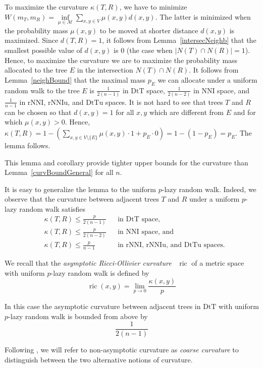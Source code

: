 \documentclass{amsart}
\theoremstyle{definition}
\newcommand{\nni}{\mathrm{NNI}}
\newcommand{\rnni}{\mathrm{rNNI}}
\newcommand{\rnniu}{\mathrm{rNNIu}}
\newcommand{\dtt}{\mathrm{DtT}}
\newcommand{\dttu}{\mathrm{DtTu}}
\newcommand{\ric}{\operatorname{ric}}
\newcommand{\M}{\mathcal{M}}
\begin{document}
\proof
To maximize the curvature $\kappa(T,R)$, we have to minimize $W(m_T,m_R) = \inf\limits_{\mu\in\M} \sum\limits_{x,y\in V}\mu(x,y) d(x,y)$.
The latter is minimized when the probability mass $\mu(x,y)$ to be moved at shorter distance $d(x,y)$ is maximized.
Since $d(T,R) = 1$, it follows from Lemma~\ref{intersecNeighb} that the smallest possible value of $d(x,y)$ is $0$ (the case when $|N(T) \cap N(R)| = 1$).
Hence, to maximize the curvature we are to maximize the probability mass allocated to the tree $E$ in the intersection $N(T) \cap N(R)$.
It follows from Lemma~\ref{neighBound} that the maximal mass $p_E$ we can allocate under a uniform random walk to the tree $E$ is $\frac{1}{2(n-1)}$ in $\dtt$ space, $\frac{1}{2(n-2)}$ in $\nni$ space, and $\frac{1}{n-1}$ in $\rnni$, $\rnniu$, and $\dttu$ spaces.
It is not hard to see that trees $T$ and $R$ can be chosen so that $d(x,y) = 1$ for all $x,y$ which are different from $E$ and for which $\mu(x,y) > 0$.
Hence, $\kappa(T, R) = 1 - \left(\sum\limits_{x,y\in V\setminus\{E\}}\mu(x,y)\cdot 1 + p_E \cdot 0\right) = 1 - (1-p_E) = p_E$.
The lemma follows.
\endproof

This lemma and corollary provide tighter upper bounds for the curvature than Lemma~\ref{curvBoundGeneral} for all $n$.

It is easy to generalize the lemma to the uniform $p$-lazy random walk.
Indeed, we observe that the curvature between adjacent trees $T$ and $R$ under a uniform $p$-lazy random walk satisfies
\begin{align*}
& \kappa(T,R) \leq \frac{p}{2(n-1)}	&& \mbox{in $\dtt$ space,}\\
& \kappa(T,R) \leq \frac{p}{2(n-2)}	&& \mbox{in $\nni$ space, and}\\
& \kappa(T,R) \leq \frac{p}{n-1}		&& \mbox{in $\rnni$, $\rnniu$, and $\dttu$ spaces.}
\end{align*}

We recall that the {\em asymptotic Ricci-Ollivier curvature}~\autocite{Loisel2014-gu} $\ric$ of a metric space with uniform $p$-lazy random walk is defined by
\[
\ric(x,y) = \lim_{p\to0} \frac{\kappa(x,y)}{p}
\]

In this case the asymptotic curvature between adjacent trees in $\dtt$ with uniform $p$-lazy random walk is bounded from above by
\[
\frac{1}{2(n-1)}
\]

Following \textcite{Loisel2014-gu}, we will refer to non-asymptotic curvature as {\em coarse curvature} to distinguish between the two alternative notions of curvature.
\end{document}
